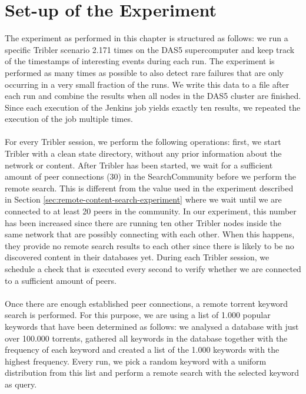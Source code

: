 \section{Set-up of the Experiment}
The experiment as performed in this chapter is structured as follows: we run a specific Tribler scenario 2.171 times on the DAS5 supercomputer and keep track of the timestamps of interesting events during each run. The experiment is performed as many times as possible to also detect rare failures that are only occurring in a very small fraction of the runs. We write this data to a file after each run and combine the results when all nodes in the DAS5 cluster are finished. Since each execution of the Jenkins job yields exactly ten results, we repeated the execution of the job multiple times.\\\\
For every Tribler session, we perform the following operations: first, we start Tribler with a clean state directory, without any prior information about the network or content. After Tribler has been started, we wait for a sufficient amount of peer  connections (30) in the SearchCommunity before we perform the remote search. This is different from the value used in the experiment described in Section \ref{sec:remote-content-search-experiment} where we wait until we are connected to at least 20 peers in the community. In our experiment, this number has been increased since there are running ten other Tribler nodes inside the same network that are possibly connecting with each other. When this happens, they provide no remote search results to each other since there is likely to be no discovered content in their databases yet. During each Tribler session, we schedule a check that is executed every second to verify whether we are connected to a sufficient amount of peers.\\\\
Once there are enough established peer connections, a remote torrent keyword search is performed. For this purpose, we are using a list of 1.000 popular keywords that have been determined as follows: we analysed a database with just over 100.000 torrents, gathered all keywords in the database together with the frequency of each keyword and created a list of the 1.000 keywords with the highest frequency. Every run, we pick a random keyword with a uniform distribution from this list and perform a remote search with the selected keyword as query.\\\\
